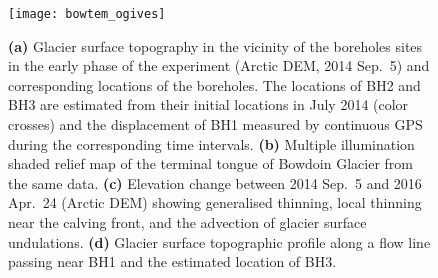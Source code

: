 \documentclass[utf8]{article}
\begin{document}
    \begin{figure}
      \centerline{\texttt{[image: bowtem\_ogives]}}
      \caption{%
        \textbf{(a)} Glacier surface topography in the vicinity of the
          boreholes sites in the early phase of the experiment (Arctic DEM,
          2014 Sep.~5) and corresponding locations of the boreholes. The
          locations of BH2 and BH3 are estimated from their initial locations
          in July 2014 (color crosses) and the displacement of BH1 measured by
          continuous GPS during the corresponding time intervals.
        \textbf{(b)} Multiple illumination shaded relief map of the terminal
          tongue of Bowdoin Glacier from the same data.
        \textbf{(c)} Elevation change between 2014 Sep.~5 and 2016 Apr.~24
          (Arctic DEM) showing generalised thinning, local thinning near the
          calving front, and the advection of glacier surface undulations.
        \textbf{(d)} Glacier surface topographic profile along a flow line
          passing near BH1 and the estimated location of BH3.}
      \label{fig:ogives}
    \end{figure}


\clearpage
\linespread{1.25}  %
\end{document}
